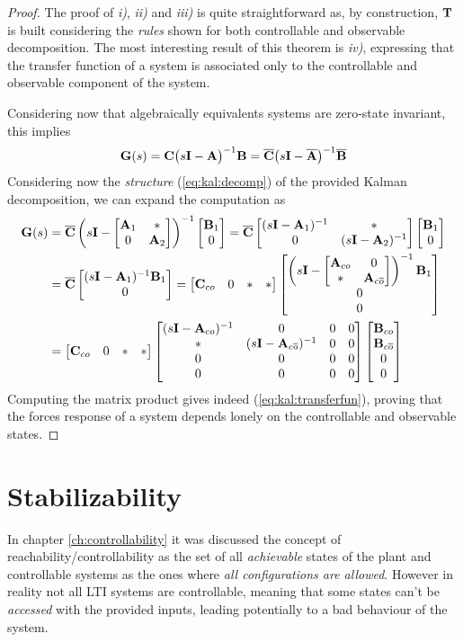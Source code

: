 	\begin{proof}
		The proof of \textit{i)}, \textit{ii)} and \textit{iii)} is quite straightforward as, by construction, $\mathbf{T}$ is built considering the \textit{rules} shown for both controllable and observable decomposition. The most interesting result of this theorem is \textit{iv)}, expressing that the transfer function of a system is associated only to the controllable and observable component of the system.
		
		Considering now that algebraically equivalents systems are zero-state invariant, this implies
		\[ \mathbf{G}(s) = \mathbf{C}\big(s\mathbf{I}-\mathbf{A}\big)^{-1} \mathbf{B} = \overline {\mathbf{C}} \big(s\mathbf{I}- \overline {\mathbf{A}}\big)^{-1}\overline {\mathbf{B}}  \]
		Considering now the \textit{structure} (\ref{eq:kal:decomp}) of the provided Kalman decomposition, we can expand the computation as
		\begin{align*}
			\mathbf{G}(s) & = \overline {\mathbf{C}} \left(s\mathbf{I}- \begin{bmatrix} \mathbf{A}_1 & * \\ 0 & \mathbf{A}_2 \end{bmatrix} \right)^{-1}\begin{bmatrix} \mathbf{B}_1 \\ 0 \end{bmatrix} = \overline {\mathbf{C}} \begin{bmatrix} (s\mathbf{I}-\mathbf{A}_1)^{-1} & * \\ 0 & (s\mathbf{I}-\mathbf{A}_2)^{-1} \end{bmatrix} \begin{bmatrix} \mathbf{B}_1 \\ 0 \end{bmatrix} \\
			& = \overline {\mathbf{C}} \begin{bmatrix} (s\mathbf{I}-\mathbf{A}_1)^{-1} \mathbf{B}_1 \\ 0 \end{bmatrix} = \begin{bmatrix} \mathbf{C}_{co} & 0 & * & * \end{bmatrix} \begin{bmatrix} \left( s\mathbf{I} - \begin{bmatrix} \mathbf{A}_{co} & 0 \\ * & \mathbf{A}_{c\overline o} \end{bmatrix} \right)^{-1}\mathbf{B}_1 \\ 0 \\ 0 \end{bmatrix} \\
			& = \begin{bmatrix} \mathbf{C}_{co} & 0 & * & * \end{bmatrix} \begin{bmatrix}  (s\mathbf{I}-\mathbf{A}_{co})^{-1} & 0 & 0 & 0 \\ * & (s\mathbf{I}-\mathbf{A}_{c\overline o})^{-1} & 0 & 0 \\ 0 & 0 & 0 & 0 \\ 0 & 0 & 0 & 0  \end{bmatrix} \begin{bmatrix} \mathbf{B}_{co} \\ \mathbf{B}_{c\overline o} \\ 0 \\ 0 \end{bmatrix}
		\end{align*} 
		Computing the matrix product gives indeed (\ref{eq:kal:transferfun}), proving that the forces response of a system depends lonely on the controllable and observable states.
	\end{proof}

\section{Stabilizability}
	In chapter \ref{ch:controllability} it was discussed the concept of reachability/controllability as the set of all \textit{achievable} states of the plant and controllable systems as the ones where \textit{all configurations are allowed}. However in reality not all LTI systems are controllable, meaning that some states can't be \textit{accessed} with the provided inputs, leading potentially to a bad behaviour of the system.
	
